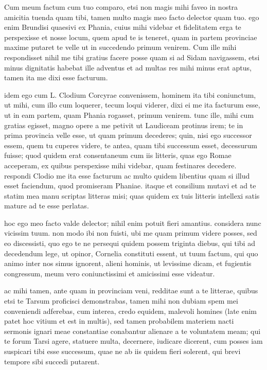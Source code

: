 


 Cum meum factum cum tuo comparo, etsi non magis mihi faveo in nostra amicitia tuenda quam tibi, tamen multo magis meo facto delector quam tuo. ego enim Brundisi quaesivi ex Phania, cuius mihi videbar et fidelitatem erga te perspexisse et nosse locum, quem apud te is teneret, quam in partem provinciae maxime putaret te velle ut in succedendo primum venirem. Cum ille mihi respondisset nihil me tibi gratius facere posse quam si ad Sidam navigassem, etsi minus dignitatis habebat ille adventus et ad multas res mihi minus erat aptus, tamen ita me dixi esse facturum.

 idem ego cum L. Clodium Corcyrae convenissem, hominem ita tibi coniunctum, ut mihi, cum illo cum loquerer, tecum loqui viderer, dixi ei me ita facturum esse, ut in eam partem, quam Phania rogasset, primum venirem. tunc ille, mihi cum gratias egisset, magno opere a me petivit ut Laudiceam protinus irem; te in prima provincia velle esse, ut quam primum decederes; quin, nisi ego successor essem, quem tu cuperes videre, te antea, quam tibi successum esset, decessurum fuisse; quod quidem erat consentaneum cum iis litteris, quas ego Romae acceperam, ex quibus perspexisse mihi videbar, quam festinares decedere. respondi Clodio me ita esse facturum ac multo quidem libentius quam si illud esset faciendum, quod promiseram Phaniae. itaque et consilium mutavi et ad te statim mea manu scriptas litteras misi; quas quidem ex tuis litteris intellexi satis mature ad te esse perlatas.

 hoc ego meo facto valde delector; nihil enim potuit fieri amantius. considera nunc vicissim tuum. non modo ibi non fuisti, ubi me quam primum videre posses, sed eo discessisti, quo ego te ne persequi quidem possem triginta diebus, qui tibi ad decedendum lege, ut opinor, Cornelia constituti essent, ut tuum factum, qui quo animo inter nos simus ignorent, alieni hominis, ut levissime dicam, et fugientis congressum, meum vero coniunctissimi et amicissimi esse videatur.

 ac mihi tamen, ante quam in provinciam veni, redditae sunt a te litterae, quibus etsi te Tarsum proficisci demonstrabas, tamen mihi non dubiam spem mei conveniendi adferebas, cum interea, credo equidem, malevoli homines (late enim patet hoc vitium et est in multis), sed tamen probabilem materiem nacti sermonis ignari meae constantiae conabantur alienare a te voluntatem meam; qui te forum Tarsi agere, statuere multa, decernere, iudicare dicerent, cum posses iam suspicari tibi esse successum, quae ne ab iis quidem fieri solerent, qui brevi tempore sibi succedi putarent.

